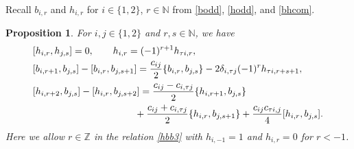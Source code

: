 \documentclass[11pt,reqno]{amsart}
\numberwithin{equation}{section}
\newtheorem{prop}[thm]{Proposition}
\theoremstyle{definition}
\theoremstyle{remark}
\newcommand{\bZ}{\mathbb{Z}}
\newcommand{\bN}{\mathbb{N}}
\begin{document}
Recall $b_{i,r}$ and $h_{i,r}$ for $i\in\{1,2\}$,  $r\in\bN$ from \eqref{bodd}, \eqref{hodd}, and \eqref{bhcom}.
\begin{prop}\label{X=3prop}
For $i,j\in\{1,2\}$ and $r,s\in\bN$, we have 
\begin{align}
&[h_{i,r},h_{j,s}]=0,\qquad h_{i,r}=(-1)^{r+1}h_{\tau i,r},\label{hhb3}\\
&[b_{i,r+1},b_{j,s}]  - [b_{i,r },b_{j,s+1 }]  =\frac{c_{ij}}{2}\{b_{i,r },b_{j,s}\}-2\delta_{i,\tau j} (-1)^{r}h_{\tau i,r+s+1 },\label{bbb3}\\
&[h_{i,r+2},b_{j,s}] - [h_{i,r},b_{j,s+2}]=\frac{c_{ij}-c_{i,\tau j}}{2}\{h_{i,r+1},b_{j,s}\}\notag\\
&\qquad\qquad\qquad \qquad \qquad \ \  +\frac{c_{ij}+c_{i,\tau j}}{2} \{h_{i,r},b_{j,s+1}\}+\frac{c_{ij}c_{\tau i,j}}{4} [h_{i,r}, b_{j,s}].\label{hbb3}
\end{align}
Here we allow $r\in\bZ$ in the relation \eqref{hbb3} with $h_{i,-1}=1$ and $h_{i,r}=0$ for $r<-1$.
\end{prop}
\end{document}
